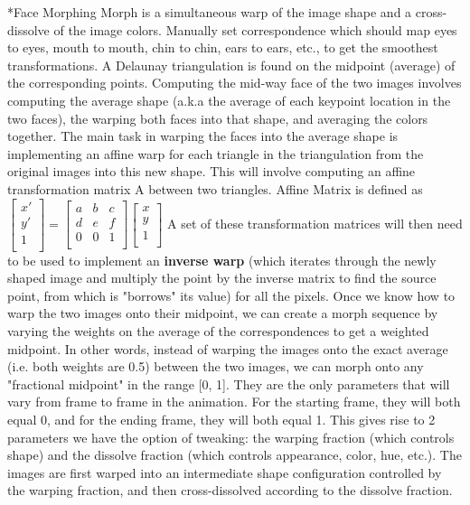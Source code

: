 \documentclass[3pt,landscape]{article}
\makeatletter
\renewcommand{\subsection}{\@startsection{subsection}{2}{0mm}{-1explus -.5ex minus -.2ex}{0.5ex plus .2ex}{\normalfont\normalsize\bfseries}}
\makeatother
\begin{document}
\begin{multicols}{3}
\subsection*{Face Morphing}
Morph is a simultaneous warp of the image shape and a cross-dissolve of the image colors. Manually set correspondence which should map eyes to eyes, mouth to mouth, chin to chin, ears to ears, etc., to get the smoothest transformations. A Delaunay triangulation is found on the midpoint (average) of the corresponding points. Computing the mid-way face of the two images involves computing the average shape (a.k.a the average of each keypoint location in the two faces), the warping both faces into that shape, and averaging the colors together. The main task in warping the faces into the average shape is implementing an affine warp for each triangle in the triangulation from the original images into this new shape. This will involve computing an affine transformation matrix A between two triangles.
Affine Matrix is defined as 
$\begin{bmatrix} 
x'\\ 
y'\\
1 \\
\end{bmatrix} = \begin{bmatrix} 
a & b & c \\ 
d & e & f \\
0 & 0 & 1 \\
\end{bmatrix}\begin{bmatrix} 
x\\ 
y\\
1\\
\end{bmatrix}$
A set of these transformation matrices will then need to be used to implement an \textbf{inverse warp} (which iterates through the newly shaped image and multiply the point by the inverse matrix to find the source point, from which is "borrows" its value) for all the pixels.
Once we know how to warp the two images onto their midpoint, we can create a morph sequence by varying the weights on the average of the correspondences to get a weighted midpoint. In other words, instead of warping the images onto the exact average (i.e. both weights are 0.5) between the two images, we can morph onto any "fractional midpoint" in the range [0, 1]. They are the only parameters that will vary from frame to frame in the animation. For the starting frame, they will both equal 0, and for the ending frame, they will both equal 1. This gives rise to 2 parameters we have the option of tweaking: the warping fraction (which controls shape) and the dissolve fraction (which controls appearance, color, hue, etc.). The images are first warped into an intermediate shape configuration controlled by the warping fraction, and then cross-dissolved according to the dissolve fraction.


\end{multicols}
\end{document}
